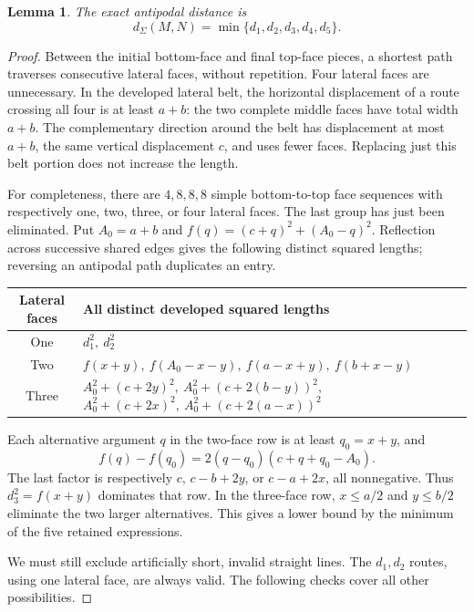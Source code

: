 \documentclass[11pt]{article}
\newtheorem{lemma}[theorem]{Lemma}
\theoremstyle{definition}
\newcommand{\surf}{\Sigma}
\newcommand{\dist}{d_{\surf}}
\begin{document}
\begin{lemma}\label{lem:five}
The exact antipodal distance is
\[
\dist(M,N)=\min\{d_1,d_2,d_3,d_4,d_5\}.
\]
\end{lemma}
\begin{proof}
Between the initial bottom-face and final top-face pieces, a shortest
path traverses consecutive lateral faces, without repetition.
Four lateral faces are unnecessary. In the developed lateral belt,
the horizontal displacement of a route crossing all four is at least
\(a+b\): the two complete middle faces have total width \(a+b\).
The complementary direction around the belt has displacement at most
\(a+b\), the same vertical displacement \(c\), and uses fewer faces.
Replacing just this belt portion does not increase the length.

For completeness, there are \(4,8,8,8\) simple bottom-to-top face
sequences with respectively one, two, three, or four lateral faces.
The last group has just been eliminated. Put \(A_0=a+b\) and
\(f(q)=(c+q)^2+(A_0-q)^2\). Reflection across successive shared
edges gives the following distinct squared lengths; reversing an
antipodal path duplicates an entry.

\begin{center}
\begin{tabular}{c p{11cm}}
\toprule
Lateral faces&All distinct developed squared lengths\\
\midrule
One&\(d_1^2,\ d_2^2\)\\[2pt]
Two&\(f(x+y),\ f(A_0-x-y),\ f(a-x+y),\ f(b+x-y)\)\\[2pt]
Three&\(A_0^2+(c+2y)^2,\ A_0^2+(c+2(b-y))^2,\)
\newline
\(A_0^2+(c+2x)^2,\ A_0^2+(c+2(a-x))^2\)\\
\bottomrule
\end{tabular}
\end{center}

Each alternative argument \(q\) in the two-face row is at least
\(q_0=x+y\), and
\[
f(q)-f(q_0)=2(q-q_0)(c+q+q_0-A_0).
\]
The last factor is respectively \(c\), \(c-b+2y\), or \(c-a+2x\),
all nonnegative. Thus \(d_3^2=f(x+y)\) dominates that row.
In the three-face row, \(x\le a/2\) and \(y\le b/2\) eliminate the
two larger alternatives. This gives a lower bound by the minimum
of the five retained expressions.

We must still exclude artificially short, invalid straight lines.
The \(d_1,d_2\) routes, using one lateral face, are always valid.
The following checks cover all other possibilities.


\end{proof}
\end{document}
